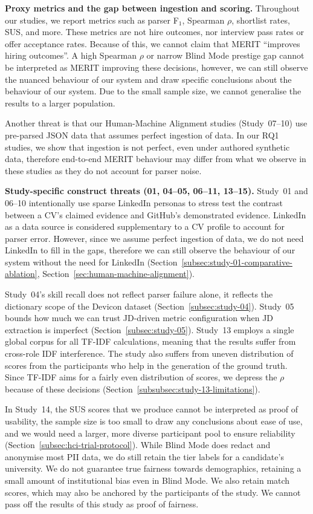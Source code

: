 \textbf{Proxy metrics and the gap between ingestion and scoring.}
Throughout our studies, we report metrics such as parser F$_1$, Spearman $\rho$, shortlist rates, SUS, and more.
These metrics are not hire outcomes, nor interview pass rates or offer acceptance rates. Because of this, we
cannot claim that MERIT ``improves hiring outcomes''. A high Spearman $\rho$ or narrow Blind Mode prestige gap
cannot be interpreted as MERIT improving these decisions, however, we can still observe the nuanced behaviour
of our system and draw specific conclusions about the behaviour of our system. Due to the small sample size,
we cannot generalise the results to a larger population.

Another threat is that our Human-Machine Alignment studies (Study~07--10) use pre-parsed JSON data that assumes
perfect ingestion of data. In our RQ1 studies, we show that ingestion is not perfect, even under authored synthetic data,
therefore end-to-end MERIT behaviour may differ from what we observe in these studies as they do not account for parser noise.

\textbf{Study-specific construct threats (01, 04--05, 06--11, 13--15).}
Study~01 and 06--10 intentionally use sparse LinkedIn personas to stress test the
contrast between a CV's claimed evidence and GitHub's demonstrated evidence. LinkedIn as a data source is considered
supplementary to a CV profile to account for parser error. However, since we assume perfect ingestion of data, we do not
need LinkedIn to fill in the gaps, therefore we can still observe the behaviour of our system without the need for LinkedIn
(Section~\ref{subsec:study-01-comparative-ablation}, 
Section~\ref{sec:human-machine-alignment}).

Study~04's skill recall does not reflect parser failure alone, it reflects the dictionary scope of the Devicon dataset
(Section~\ref{subsec:study-04}).
Study~05 bounds how much we can trust JD-driven metric configuration when JD extraction is imperfect (Section~\ref{subsec:study-05}).
Study~13 employs a single global corpus for all TF-IDF calculations, meaning that the results suffer
from cross-role IDF interference. The study also suffers from uneven distribution of scores from the participants who
help in the generation of the ground truth. Since TF-IDF aims for a fairly even distribution of scores, we depress
the $\rho$ because of these decisions (Section~\ref{subsubsec:study-13-limitations}).

In Study~14, the SUS scores that we produce cannot be interpreted as proof of usability, the sample size is too small
to draw any conclusions about ease of use, and we would need a larger, more diverse participant pool to ensure reliability (Section~\ref{subsec:hci-trial-protocol}).
While Blind Mode does redact and anonymise most PII data, we do still retain the tier labels for a candidate's
university. We do not guarantee true fairness towards demographics, retaining a small amount of institutional bias even in Blind Mode.
We also retain match scores, which may also be anchored by the participants of the study. We cannot pass off the results of this
study as proof of fairness.

